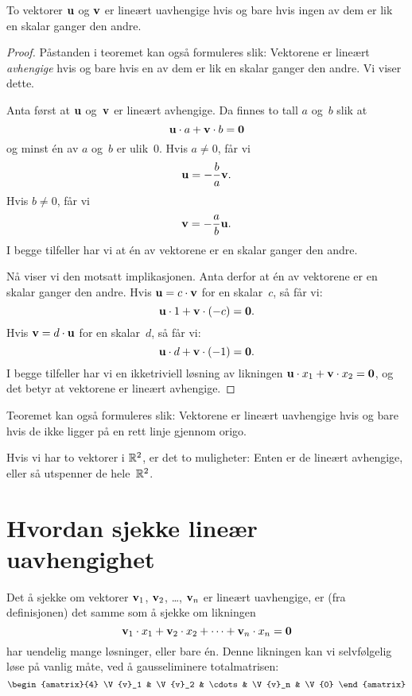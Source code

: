 \begin{thm}
\label{thm:lin-uavh-2}
To vektorer $\mathbf{u}$ og $\mathbf{v}$ er lineært uavhengige hvis og bare
hvis ingen av dem er lik en skalar ganger den andre.
\end{thm}
\begin{proof}
Påstanden i teoremet kan også formuleres slik: Vektorene er lineært
\emph{avhengige} hvis og bare hvis en av dem er lik en skalar ganger
den andre.  Vi viser dette.

Anta først at $\mathbf{u}$ og~$\mathbf{v}$ er lineært avhengige.  Da finnes
to tall $a$ og~$b$ slik at
\[
\mathbf{u} \cdot a + \mathbf{v} \cdot b = \mathbf{0}
\]
og minst én av $a$ og~$b$ er ulik~$0$.  Hvis $a \ne 0$, får vi
\[
\mathbf{u} = - \frac{b}{a} \mathbf{v}.
\]
Hvis $b \ne 0$, får vi
\[
\mathbf{v} = - \frac{a}{b} \mathbf{u}.
\]
I begge tilfeller har vi at én av vektorene er en skalar ganger den
andre.

Nå viser vi den motsatt implikasjonen.  Anta derfor at én av vektorene
er en skalar ganger den andre.  Hvis $\mathbf{u} = c \cdot \mathbf{v}$ for en
skalar~$c$, så får vi:
\[
\mathbf{u} \cdot 1 + \mathbf{v} \cdot (-c) = \mathbf{0}.
\]
Hvis $\mathbf{v} = d \cdot \mathbf{u}$ for en skalar~$d$, så får vi:
\[
\mathbf{u} \cdot d + \mathbf{v} \cdot (-1) = \mathbf{0}.
\]
I begge tilfeller har vi en ikketriviell løsning av likningen
$\mathbf{u} \cdot x_1 + \mathbf{v} \cdot x_2 = \mathbf{0}$,
og det betyr at vektorene er lineært avhengige.
\end{proof}

Teoremet kan også formuleres slik: Vektorene er lineært uavhengige
hvis og bare hvis de ikke ligger på en rett linje gjennom origo.

Hvis vi har to vektorer i $\mathbb{R}^2$, er det to muligheter: Enten er de
lineært avhengige, eller så utspenner de hele~$\mathbb{R}^2$.



\section*{Hvordan sjekke lineær uavhengighet}

Det å sjekke om vektorer $\mathbf{v}_1$, $\mathbf{v}_2$, \ldots, $\mathbf{v}_n$ er
lineært uavhengige, er (fra definisjonen) det samme som å sjekke om
likningen
\[
\mathbf{v}_1 \cdot x_1 + \mathbf{v}_2 \cdot x_2 + \cdots + \mathbf{v}_n \cdot x_n = \mathbf{0}
\]
har uendelig mange løsninger, eller bare én.  Denne likningen kan vi
selvfølgelig løse på vanlig måte, ved å gausseliminere totalmatrisen:
\[
\begin{amatrix}{4}
\V{v}_1 & \V{v}_2 & \cdots & \V{v}_n & \V{0}
\end{amatrix}
\]


